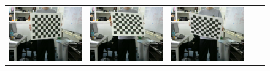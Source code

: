 \documentclass[]{jarticle}          %
\begin{document}
\begin{figure}[!ht]
\begin{center}
\begin{tabular}{ccccc}
      \includegraphics[keepaspectratio, scale=0.1]{figures/carib/camera1/3.png}&
      \includegraphics[keepaspectratio, scale=0.1]{figures/carib/camera1/4.png}&
      \includegraphics[keepaspectratio, scale=0.1]{figures/carib/camera1/5.png}\\

\end{tabular}
\end{center}
\end{figure}
\end{document}

